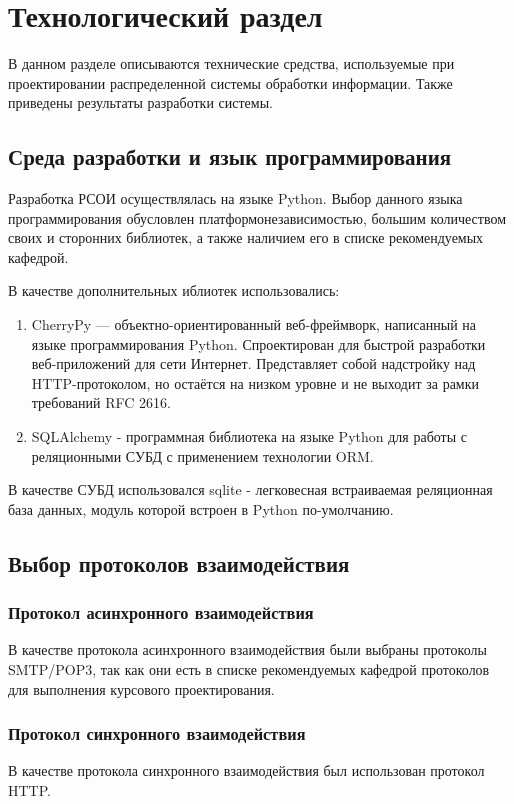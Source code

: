 \chapter{Технологический раздел}
\label{cha:impl}
В данном разделе описываются технические средства, используемые при проектировании распределенной системы обработки информации. Также приведены результаты разработки системы.

\section{Среда разработки и язык программирования}
Разработка РСОИ осуществлялась на языке Python.
Выбор данного языка программирования обусловлен платформонезависимостью, большим количеством своих и сторонних библиотек, а также наличием его в списке рекомендуемых кафедрой.

В качестве дополнительных иблиотек использовались:
\begin{enumerate}
\item CherryPy — объектно-ориентированный веб-фреймворк, написанный на языке программирования Python. Спроектирован для быстрой разработки веб-приложений для сети Интернет. Представляет собой надстройку над HTTP-протоколом, но остаётся на низком уровне и не выходит за рамки требований RFC 2616.
\item SQLAlchemy - программная библиотека на языке Python для работы с реляционными СУБД с применением технологии ORM. 
\end{enumerate}

В качестве СУБД использовался sqlite - легковесная встраиваемая реляционная база данных, модуль которой встроен в Python по-умолчанию.

\section{Выбор протоколов взаимодействия}
\subsection{Протокол асинхронного взаимодействия}
В качестве протокола асинхронного взаимодействия были выбраны протоколы SMTP/POP3, так как они есть в списке рекомендуемых кафедрой протоколов для выполнения курсового проектирования.

\subsection{Протокол синхронного взаимодействия}
В качестве протокола синхронного взаимодействия был использован протокол HTTP.


